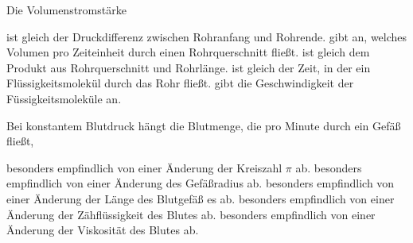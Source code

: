\documentclass[11pt]{exam}
\begin{document}
\begin{questions}
\vspace{3mm}\question Die Volumenstromstärke

\begin{choices}
	\choice ist gleich der Druckdifferenz zwischen Rohranfang und Rohrende.
	\choice gibt an, welches Volumen pro Zeiteinheit durch einen Rohrquerschnitt fließt.
	\choice ist gleich dem Produkt aus Rohrquerschnitt und Rohrlänge.
	\choice ist gleich der Zeit, in der ein Flüssigkeitsmolekül durch das Rohr fließt.
	\choice gibt die Geschwindigkeit der Füssigkeitsmoleküle an.
\end{choices}

\vspace{3mm}\question Bei konstantem Blutdruck hängt die Blutmenge, die pro Minute durch ein Gefäß fließt,

\begin{choices}
	\choice besonders empfindlich von einer Änderung der Kreiszahl \(\pi\) ab.
	\choice besonders empfindlich von einer Änderung des Gefäßradius ab.
	\choice besonders empfindlich von einer Änderung der Länge des Blutgefäß es ab.
	\choice besonders empfindlich von einer Änderung der Zähflüssigkeit des Blutes ab.
	\choice besonders empfindlich von einer Änderung der Viskosität des Blutes ab.
\end{choices}

\vspace{3mm}\end{questions}
\end{document}
